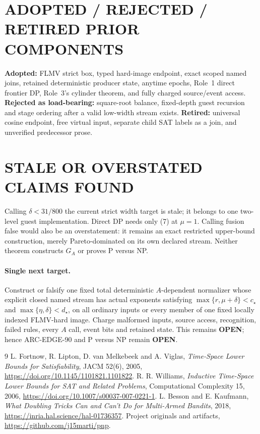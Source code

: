 \documentclass[11pt]{article}
\newcommand{\OPEN}{\textbf{OPEN}}
\begin{document}
\section{ADOPTED / REJECTED / RETIRED PRIOR COMPONENTS}
\textbf{Adopted:} FLMV strict box, typed hard-image endpoint, exact scoped
named joins, retained deterministic producer state, anytime epochs, Role~1
direct frontier DP, Role~3's cylinder theorem, and fully charged source/event
access.  \textbf{Rejected as load-bearing:} square-root balance, fixed-depth
guest recursion and stage ordering after a valid low-width stream exists.
\textbf{Retired:} universal cosine endpoint, free virtual input, separate
child SAT labels as a join, and unverified predecessor prose.

\section{STALE OR OVERSTATED CLAIMS FOUND}
Calling $\delta<31/800$ the current strict width target is stale; it belongs
to one two-level guest implementation.  Direct DP needs only (7) at
$\mu=1$.  Calling fusion false would also be an overstatement: it remains an
exact restricted upper-bound construction, merely Pareto-dominated on its own
declared stream.  Neither theorem constructs $G_A$ or proves P versus NP.

\paragraph{Single next target.}
Construct or falsify one fixed total deterministic $A$-dependent normalizer
whose explicit closed named stream has actual exponents satisfying
$\max\{r,\mu+\delta\}<c_\star$ and
$\max\{\eta,\delta\}<d_\star$, on all ordinary inputs or every member of one
fixed locally indexed FLMV-hard image.  Charge malformed inputs, source
access, recognition, failed rules, every $A$ call, event bits and retained
state.  This remains \OPEN; hence ARC-EDGE-90 and P versus NP remain \OPEN.

\begin{thebibliography}{9}
 L. Fortnow, R. Lipton, D. van Melkebeek and A. Viglas,
\emph{Time-Space Lower Bounds for Satisfiability}, JACM 52(6), 2005,
\url{https://doi.org/10.1145/1101821.1101822}.
 R. R. Williams,
\emph{Inductive Time-Space Lower Bounds for SAT and Related Problems},
Computational Complexity 15, 2006,
\url{https://doi.org/10.1007/s00037-007-0221-1}.
 L. Besson and E. Kaufmann,
\emph{What Doubling Tricks Can and Can't Do for Multi-Armed Bandits}, 2018,
\url{https://inria.hal.science/hal-01736357}.
 Project originals and artifacts,
\url{https://github.com/j15marti/pnp}.
\end{thebibliography}
\end{document}
